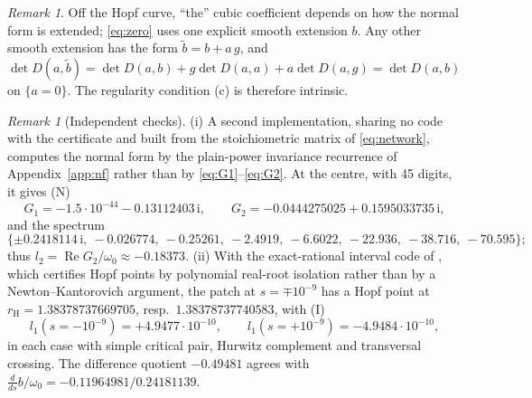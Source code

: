 \documentclass[11pt,a4paper]{article}
\theoremstyle{plain}
\theoremstyle{definition}
\theoremstyle{remark}
\newtheorem{remark}[theorem]{Remark}
\newcommand{\ii}{\mathrm i}
\DeclareMathOperator{\Ree}{Re}
\newcommand{\evI}{\textsf{I}}
\newcommand{\evN}{\textsf{N}}
\begin{document}
\begin{remark}\label{rem:extension}
Off the Hopf curve, ``the'' cubic coefficient depends on how the normal form is extended; \eqref{eq:zero} uses one explicit smooth extension $b$. Any other smooth extension has the form $\tilde b=b+a\,g$, and $\det D(a,\tilde b)=\det D(a,b)+g\det D(a,a)+a\det D(a,g)=\det D(a,b)$ on $\{a=0\}$. The regularity condition (c) is therefore intrinsic.
\end{remark}

\begin{remark}[Independent checks]\label{rem:indep}
(i) A second implementation, sharing no code with the certificate and built from the stoichiometric matrix of \eqref{eq:network}, computes the normal form by the plain-power invariance recurrence of Appendix~\ref{app:nf} rather than by \eqref{eq:G1}--\eqref{eq:G2}. At the centre, with 45 digits, it gives (\evN)
\[
G_1=-1.5\cdot10^{-44}-0.13112403\,\ii,\qquad G_2=-0.0444275025+0.1595033735\,\ii,
\]
and the spectrum
\[
\{\pm0.2418114\,\ii,\ -0.026774,\ -0.25261,\ -2.4919,\ -6.6022,\ -22.936,\ -38.716,\ -70.595\};
\]
thus $l_2=\Ree G_2/\omega_0\approx-0.18373$.
(ii) With the exact-rational interval code of \cite{CompanionOscillations}, which certifies Hopf points by polynomial real-root isolation rather than by a Newton--Kantorovich argument, the patch at $s=\mp10^{-9}$ has a Hopf point at $r_{\mathrm H}=1.38378737669705$, resp.\ $1.38378737740583$, with (\evI)
\[
l_1(s=-10^{-9})=+4.9477\cdot10^{-10},\qquad l_1(s=+10^{-9})=-4.9484\cdot10^{-10},
\]
in each case with simple critical pair, Hurwitz complement and transversal crossing. The difference quotient $-0.49481$ agrees with $\frac d{ds}b/\omega_0=-0.11964981/0.24181139$.
\end{remark}
\end{document}

